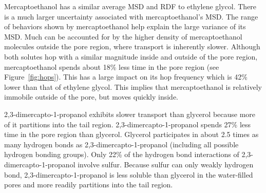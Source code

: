 \documentclass[journal=jpcbfk,manuscript=article]{achemso}
\begin{document}
  Mercaptoethanol has a similar average MSD and RDF to ethylene glycol.
  There is a much larger uncertainty associated with mercaptoethanol's
  MSD. The range of behaviors shown by mercaptoethanol help explain the
  large variance of its MSD. Much can be accounted for by the higher 
  density of mercaptoethanol molecules outside the pore region, where 
  transport is inherently slower. Although both solutes
  hop with a similar magnitude inside and outside of the pore region, mercaptoethanol 
  spends about 18\% less time in the pore region (see Figure~\ref{fig:hops}).
  This has a large impact on its hop frequency which is 42\% lower than that 
  of ethylene glycol. This implies that mercaptoethanol is relatively
  immobile outside of the pore, but moves quickly inside.

  
  2,3-dimercapto-1-propanol exhibits slower transport than glycerol 
  because more of it partitions into the tail region. 2,3-dimercapto-1-propanol
  spends 27\% less time in the pore region than glycerol. 
  Glycerol participates in about 2.5 times as many hydrogen
  bonds as 2,3-dimercapto-1-propanol (including all possible hydrogen bonding groups).  %
  Only 22\% of the hydrogen bond interactions of 2,3-dimercapto-1-propanol
  involve sulfur. Because sulfur can only weakly hydrogen bond, 
  2,3-dimercapto-1-propanol is less soluble than glycerol in the water-filled
  pores and more readily partitions into the tail region.
  
\end{document}
